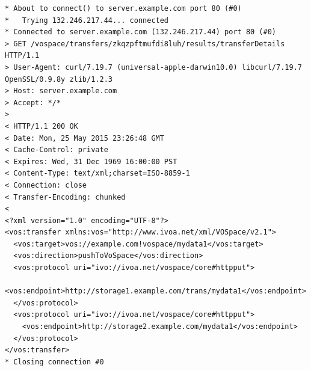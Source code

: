 \documentclass[11pt,a4paper]{ivoa}
\begin{document}
\begin{lstlisting}
* About to connect() to server.example.com port 80 (#0)
*   Trying 132.246.217.44... connected
* Connected to server.example.com (132.246.217.44) port 80 (#0)
> GET /vospace/transfers/zkqzpftmufdi8luh/results/transferDetails HTTP/1.1
> User-Agent: curl/7.19.7 (universal-apple-darwin10.0) libcurl/7.19.7 OpenSSL/0.9.8y zlib/1.2.3
> Host: server.example.com
> Accept: */*
>
< HTTP/1.1 200 OK
< Date: Mon, 25 May 2015 23:26:48 GMT
< Cache-Control: private
< Expires: Wed, 31 Dec 1969 16:00:00 PST
< Content-Type: text/xml;charset=ISO-8859-1
< Connection: close
< Transfer-Encoding: chunked
<
<?xml version="1.0" encoding="UTF-8"?>
<vos:transfer xmlns:vos="http://www.ivoa.net/xml/VOSpace/v2.1">
  <vos:target>vos://example.com!vospace/mydata1</vos:target>
  <vos:direction>pushToVoSpace</vos:direction>
  <vos:protocol uri="ivo://ivoa.net/vospace/core#httpput">
    <vos:endpoint>http://storage1.example.com/trans/mydata1</vos:endpoint>
  </vos:protocol>
  <vos:protocol uri="ivo://ivoa.net/vospace/core#httpput">
    <vos:endpoint>http://storage2.example.com/mydata1</vos:endpoint>
  </vos:protocol>
</vos:transfer>
* Closing connection #0
\end{lstlisting}
\end{document}
